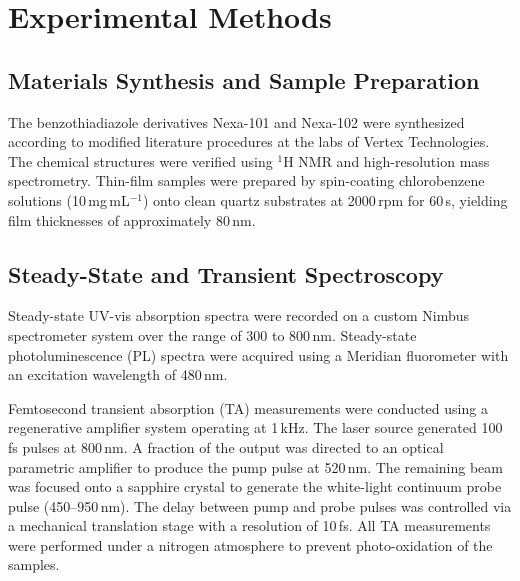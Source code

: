 \section{Experimental Methods}
\subsection{Materials Synthesis and Sample Preparation}
The benzothiadiazole derivatives Nexa-101 and Nexa-102 were synthesized according to modified literature procedures at the labs of Vertex Technologies.\cite{Meridian2026} The chemical structures were verified using $^1$H NMR and high-resolution mass spectrometry. Thin-film samples were prepared by spin-coating chlorobenzene solutions (10\,mg\,mL$^{-1}$) onto clean quartz substrates at 2000\,rpm for 60\,s, yielding film thicknesses of approximately 80\,nm.

\subsection{Steady-State and Transient Spectroscopy}
Steady-state UV-vis absorption spectra were recorded on a custom Nimbus spectrometer system over the range of 300 to 800\,nm. Steady-state photoluminescence (PL) spectra were acquired using a Meridian fluorometer with an excitation wavelength of 480\,nm.

Femtosecond transient absorption (TA) measurements were conducted using a regenerative amplifier system operating at 1\,kHz. The laser source generated 100\,fs pulses at 800\,nm. A fraction of the output was directed to an optical parametric amplifier to produce the pump pulse at 520\,nm. The remaining beam was focused onto a sapphire crystal to generate the white-light continuum probe pulse (450--950\,nm). The delay between pump and probe pulses was controlled via a mechanical translation stage with a resolution of 10\,fs. All TA measurements were performed under a nitrogen atmosphere to prevent photo-oxidation of the samples.
